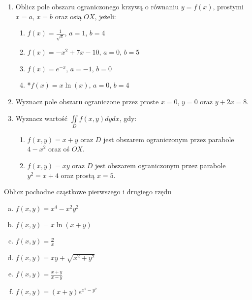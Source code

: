 \documentclass[12pt,a4paper]{article}
\begin{document}
	\begin{enumerate}
		\item 	Oblicz pole obszaru ograniczonego krzywą o równaniu $y=f(x)$, prostymi $x=a$, $x=b$ oraz osią $OX$, jeżeli:
	\begin{enumerate}
		\item $f(x)=\frac{1}{\sqrt{x}}$, $a=1$, $b=4$
		\item $f(x)=-x^2+7x-10$, $a=0$, $b=5$
		\item $f(x)=e^{-x}$, $a=-1$, $b=0$
		\item *$f(x)=x\ln(x)$, $a=0$, $b=4$
	\end{enumerate}
		\item Wyznacz pole obszaru ograniczone przez proste $x=0$, $y=0$ oraz $y+2x=8$.
		\item Wyznacz wartość $\iint \limits_D f(x,y) dydx $, gdy:
	\begin{enumerate}
		\item $f(x,y)=x+y$ oraz $D$ jest obszarem ograniczonym przez parabole $4-x^2$ oraz oś $OX$.
		\item $f(x,y)=xy$ oraz $D$ jest obszarem ograniczonym przez parabole $y^2=x+4$ oraz prostą $x=5$.
	\end{enumerate}
	\end{enumerate}


	Oblicz pochodne cząstkowe pierwszego i drugiego rzędu
	\begin{enumerate}[a)]
		\item $f(x,y)=x^4-x^2y^2$
		\item $f(x,y)=x \ln (x+y)$
		\item $f(x,y)=\frac{y}{x}$
		\item $f(x,y)=xy+\sqrt{x^2+y^2}$
		\item $f(x,y)=\frac{x+y}{x-y}$
		\item $f(x,y)=(x+y)e^{x^2-y^2}$		
	\end{enumerate}
\end{document}
